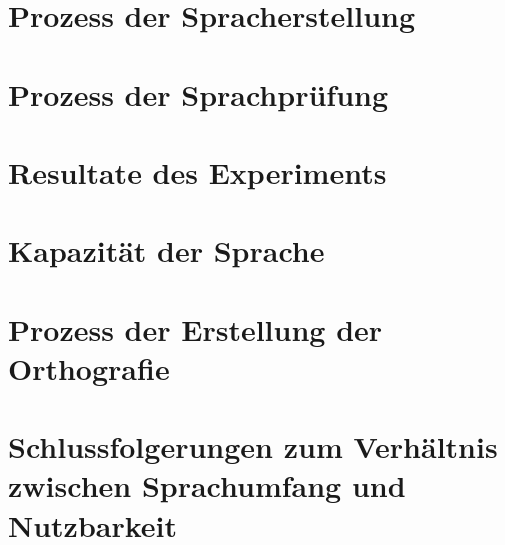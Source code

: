 \documentclass{article}
\begin{document}
\section{Prozess der Spracherstellung}



\section{Prozess der Sprachprüfung}



\section{Resultate des Experiments}



\section{Kapazität der Sprache}



\section{Prozess der Erstellung der Orthografie}



\section{Schlussfolgerungen zum Verhältnis zwischen Sprachumfang und Nutzbarkeit}





\end{document}
